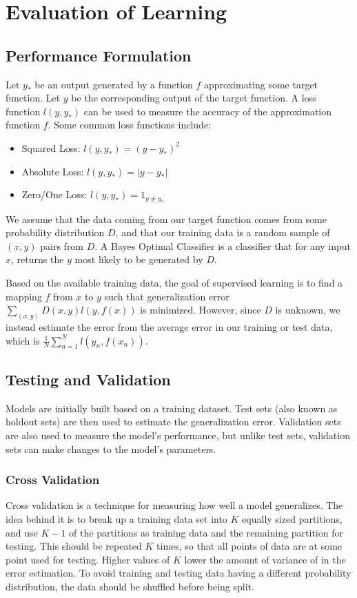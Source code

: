 \documentclass[12pt]{article}
\begin{document}
\section{Evaluation of Learning}
    \subsection{Performance Formulation}
        Let $y_*$ be an output generated by a function $f$ approximating some target function. Let $y$ be the corresponding
        output of the target function. A loss function $l(y, y_*)$ can be used to measure the accuracy of the approximation
        function $f$. Some common loss functions include:
        \begin{itemize}
            \item Squared Loss: $l(y, y_*) = (y - y_*)^2$
            \item Absolute Loss: $l(y, y_*) = |y - y_*|$
            \item Zero/One Loss: $l(y, y_*) = 1_{y \neq y_*}$
        \end{itemize}

        We assume that the data coming from our target function comes from some probability distribution $D$, and that our training data
        is a random sample of $(x, y)$ pairs from $D$. A Bayes Optimal Classifier is a classifier that for any input $x$, returns the
        $y$ most likely to be generated by $D$.

        Based on the available training data, the goal of supervised learning is to find a mapping $f$ from $x$ to $y$ such that
        generalization error $\sum_{(x,y)} D(x,y)l(y,f(x))$ is minimized. However, since $D$ is unknown, we instead estimate the error from
        the average error in our training or test data, which is $\frac{1}{N}\sum_{n=1}^N l(y_n, f(x_n))$.

    \subsection{Testing and Validation}
        Models are initially built based on a training dataset. Test sets (also known as holdout sets) are then used to estimate the generalization
        error. Validation sets are also used to measure the model's performance, but unlike test sets, validation sets can make changes to the model's
        parameters.

        \subsubsection{Cross Validation}
            Cross validation is a technique for measuring how well a model generalizes. The idea behind it is to break up a training data set into $K$
            equally sized partitions, and use $K-1$ of the partitions as training data and the remaining partition for testing. This should be repeated
            $K$ times, so that all points of data are at some point used for testing. Higher values of $K$ lower the amount of variance of in the error
            estimation. To avoid training and testing data having a different probability distribution, the data should be shuffled before being split.
\end{document}
